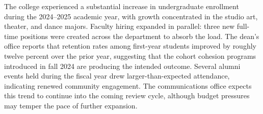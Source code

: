 The college experienced a substantial increase in undergraduate
enrollment during the 2024--2025 academic year, with growth concentrated
in the studio art, theater, and dance majors. Faculty hiring expanded
in parallel: three new full-time positions were created across the
department to absorb the load. The dean's office reports that retention
rates among first-year students improved by roughly twelve percent over
the prior year, suggesting that the cohort cohesion programs introduced
in fall 2024 are producing the intended outcome. Several alumni events
held during the fiscal year drew larger-than-expected attendance,
indicating renewed community engagement. The communications office
expects this trend to continue into the coming review cycle, although
budget pressures may temper the pace of further expansion.
